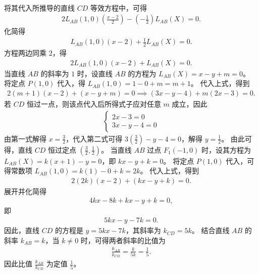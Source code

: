 \begin{solution}
\begin{align*}
\end{align*}
将其代入所推导的直线 $CD$ 等效方程中，可得
\begin{align*}
2L_{AB}(1,0)\left(\frac{x-2}{2}\right) - \left(-\frac{1}{2}\right) L_{AB}(X) = 0.
\end{align*}
化简得
\begin{align*}
L_{AB}(1,0)(x - 2) + \frac{1}{2} L_{AB}(X) = 0.
\end{align*}
方程两边同乘 $2$，得
\begin{align*}
2L_{AB}(1,0)(x - 2) + L_{AB}(X) = 0.
\end{align*}
当直线 $AB$ 的斜率为 $1$ 时，设直线 $AB$ 的方程为 $L_{AB}(X) = x - y + m = 0$。
将定点 $P(1,0)$ 代入，得 $L_{AB}(1,0) = 1 - 0 + m = m + 1$。
代入上式，得到
\begin{align*}
2(m+1)(x - 2) + (x - y + m) = 0\implies(3x - y - 4) + m(2x - 3) = 0.
\end{align*}
若 $CD$ 恒过一点，则该点代入后所得式子应对任意 $m$ 成立，因此
\begin{align*}
\begin{cases}
2x - 3 = 0 \\
3x - y - 4 = 0
\end{cases}
\end{align*}
由第一式解得 $x = \frac{3}{2}$，代入第二式可得 $3\left(\frac{3}{2}\right) - y - 4 = 0$，解得 $y = \frac{1}{2}$。
由此可得，直线 $CD$ 恒过定点 $\left(\frac{3}{2}, \frac{1}{2}\right)$。
当直线 $AB$ 过点 $F_1(-1,0)$ 时，设其方程为 $L_{AB}(X) = k(x + 1) - y = 0$，即 $kx - y + k = 0$。
将定点 $P(1,0)$ 代入，可得常数项 $L_{AB}(1,0) = k(1) - 0 + k = 2k$。
代入上式，得到
\begin{align*}
2(2k)(x - 2) + (kx - y + k) = 0.
\end{align*}
展开并化简得
\begin{align*}
4kx - 8k + kx - y + k = 0,
\end{align*}
即
\begin{align*}
5kx - y - 7k = 0.
\end{align*}
因此，直线 $CD$ 的方程是 $y = 5kx - 7k$，其斜率为 $k_{CD} = 5k$。
结合直线 $AB$ 的斜率 $k_{AB} = k$，当 $k \neq 0$ 时，可得两者斜率的比值为
\begin{align*}
\frac{k_{AB}}{k_{CD}} = \frac{k}{5k} = \frac{1}{5}.
\end{align*}
因此比值 $\frac{k_{AB}}{k_{CD}}$ 为定值 $\frac{1}{5}$。
\end{solution}

